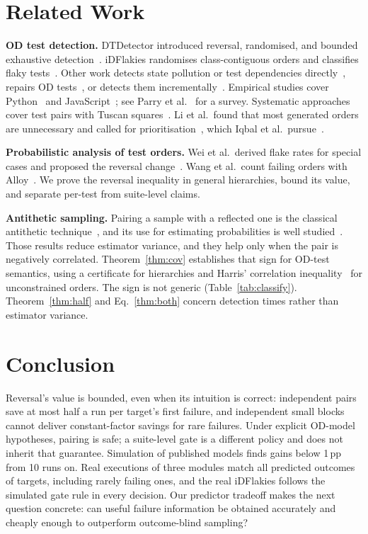 \documentclass[conference,letterpaper]{IEEEtran}
\theoremstyle{definition}
\newcommand{\pp}{\,pp}
\begin{document}
\section{Related Work}\label{sec:related}
\textbf{OD test detection.} DTDetector introduced reversal, randomised, and bounded exhaustive detection~\cite{zhang2014dtdetector}. iDFlakies randomises class-contiguous orders and classifies flaky tests~\cite{lam2019idflakies}. Other work detects state pollution or test dependencies directly~\cite{gyori2015poldet,bell2015electrictest,gambi2018pradet}, repairs OD tests~\cite{shi2019ifixflakies}, or detects them incrementally~\cite{li2022incidflakies}. Empirical studies cover Python~\cite{gruber2021python} and JavaScript~\cite{hashemi2025js}; see Parry et al.~\cite{parry2021survey} for a survey. Systematic approaches cover test pairs with Tuscan squares~\cite{wei2021tacas,li2023issta}. Li et al.\ found that most generated orders are unnecessary and called for prioritisation~\cite{li2023issta}, which Iqbal et al.\ pursue~\cite{iqbal2025ftw}.

\textbf{Probabilistic analysis of test orders.} Wei et al.\ derived flake rates for special cases and proposed the reversal change~\cite{wei2021tacas}. Wang et al.\ count failing orders with Alloy~\cite{wang2021alloy}. We prove the reversal inequality in general hierarchies, bound its value, and separate per-test from suite-level claims.

\textbf{Antithetic sampling.} Pairing a sample with a reflected one is the classical antithetic technique~\cite{hammersley1956antithetic,owen2013mc}, and its use for estimating probabilities is well studied~\cite{snijders1984antithetic}. Those results reduce estimator variance, and they help only when the pair is negatively correlated. Theorem~\ref{thm:cov} establishes that sign for OD-test semantics, using a certificate for hierarchies and Harris' correlation inequality~\cite{harris1960} for unconstrained orders. The sign is not generic (Table~\ref{tab:classify}). Theorem~\ref{thm:half} and Eq.~\eqref{thm:both} concern detection times rather than estimator variance.

\section{Conclusion}\label{sec:conclusion}
Reversal's value is bounded, even when its intuition is correct: independent pairs save at most half a run per target's first failure, and independent small blocks cannot deliver constant-factor savings for rare failures. Under explicit OD-model hypotheses, pairing is safe; a suite-level gate is a different policy and does not inherit that guarantee. Simulation of \NTargets{} published models finds gains below 1\pp{} from 10 runs on. Real executions of three modules match all \ExecAllComparisons{} predicted outcomes of \ExecAllTargets{} targets, including rarely failing ones, and the real iDFlakies follows the simulated gate rule in every decision. Our predictor tradeoff makes the next question concrete: can useful failure information be obtained accurately and cheaply enough to outperform outcome-blind sampling?
\end{document}
